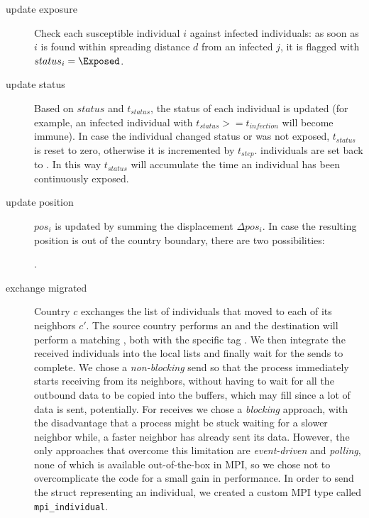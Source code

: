 \begin{description}
    \item[update exposure] Check each susceptible individual $i$ against infected individuals: as soon as $i$ is found within spreading distance $d$ from an infected $j$, it is flagged with $status_i = \Exposed$.

    \item[update status] Based on $status$ and $t_{status}$, the status of each individual is updated (for example, an infected individual with $t_{status} >= t_{infection}$ will become immune). In case the individual changed status or was not exposed, $t_{status}$ is reset to zero, otherwise it is incremented by $t_{step}$. \Exposed individuals are set back to \NotExposed. In this way $t_{status}$ will accumulate the time an individual has been continuously exposed.
     
    \item[update position] $pos_i$ is updated by summing the displacement $\Delta pos_i$. In case the resulting position is out of the country boundary, there are two possibilities:
    .

    \item[exchange migrated] Country $c$ exchanges the list of individuals that moved to each of its neighbors $c'$. The source country performs an \MPIIsend and the destination will perform a matching \MPIRecv , both with the specific tag \MigratedTag.
    We then integrate the received individuals into the local lists and finally wait for the sends to complete.
    We chose a \emph{non-blocking} send so that the process immediately starts receiving from its neighbors, without having to wait for all the outbound data to be copied into the buffers, which may fill since a lot of data is sent, potentially. For receives we chose a \emph{blocking} approach, with the disadvantage that a process might be stuck waiting for a slower neighbor while, a faster neighbor has already sent its data. However, the only approaches that overcome this limitation are \emph{event-driven} and \emph{polling}, none of which is available out-of-the-box in MPI, so we chose not to overcomplicate the code for a small gain in performance.
    In order to send the struct representing an individual, we created a custom MPI type called \texttt{mpi\_individual}.


\end{description}
